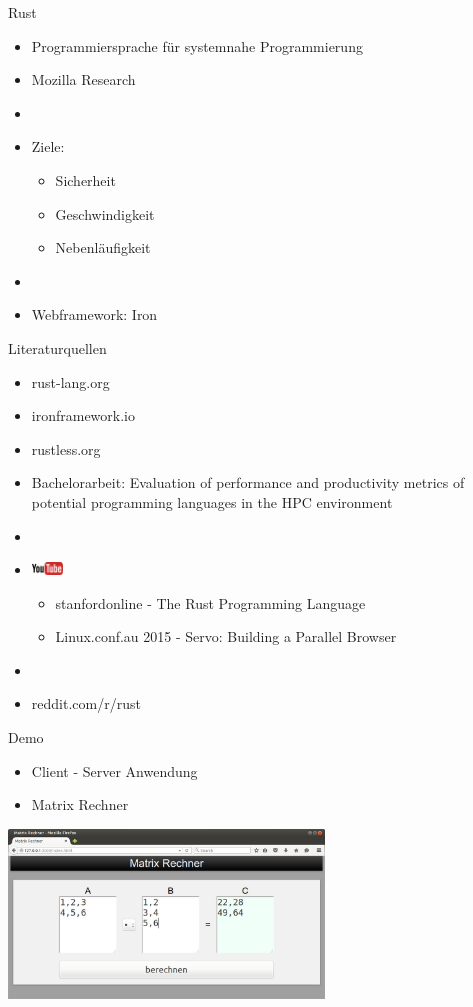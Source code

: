 \documentclass[12pt]{beamer}
\begin{document}
\begin{frame}{Rust}
	\begin{itemize}
	  \item Programmiersprache für systemnahe Programmierung 
	  \item Mozilla Research
	  \item[]
	  \item Ziele:
	  \begin{itemize}
	    \item Sicherheit
	    \item Geschwindigkeit
	    \item Nebenläufigkeit
	  \end{itemize}
	  \item[]
	  \item Webframework: Iron 
	\end{itemize}
\end{frame}

\begin{frame}{Literaturquellen}
	\begin{itemize}
	  \item rust-lang.org
	  \item ironframework.io
	  \item rustless.org
	  \item \footnotesize Bachelorarbeit:  Evaluation of performance and productivity metrics of potential programming languages in the HPC environment
	  \item[]
	  \item \includegraphics[height=3.5mm]{youtube_logo.eps}
	  	\begin{itemize}
	  	\item stanfordonline - The Rust Programming Language 
	  	  \item Linux.conf.au 2015 - Servo: Building a Parallel Browser
	  	\end{itemize}
	  	\item[]
	  \item reddit.com/r/rust
	\end{itemize}
\end{frame}

\begin{frame}{Demo}
	\begin{itemize}
	  \item Client - Server Anwendung
	  \item Matrix Rechner
	\end{itemize}
	\begin{center}
		\includegraphics[height=4.5cm]{demo.jpg}
	\end{center}
\end{frame}
\end{document}
